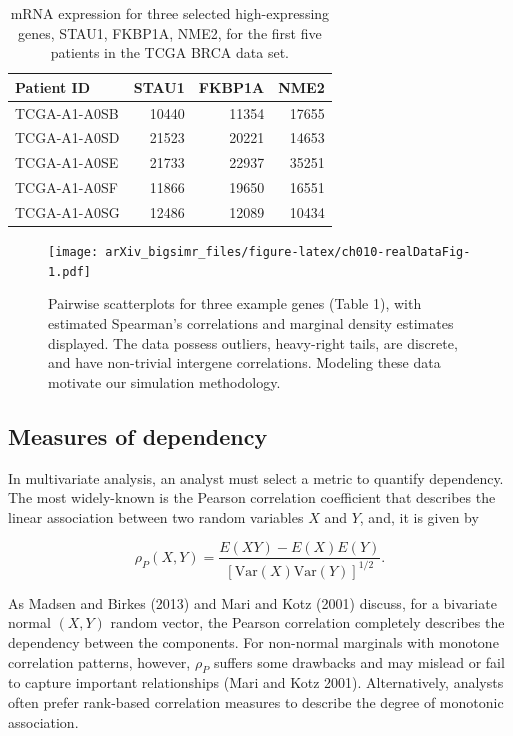 \documentclass{article}
\begin{document}
\begin{table}

\caption{\label{tab:ch010-realDataTab}mRNA expression for three selected high-expressing genes, STAU1, FKBP1A, NME2, for the first five patients in the TCGA BRCA data set.}
\centering
\begin{tabular}[t]{lrrr}
\toprule
Patient ID & STAU1 & FKBP1A & NME2\\
\midrule
TCGA-A1-A0SB & 10440 & 11354 & 17655\\
TCGA-A1-A0SD & 21523 & 20221 & 14653\\
TCGA-A1-A0SE & 21733 & 22937 & 35251\\
TCGA-A1-A0SF & 11866 & 19650 & 16551\\
TCGA-A1-A0SG & 12486 & 12089 & 10434\\
\bottomrule
\end{tabular}
\end{table}

\begin{figure}
\centering
\texttt{[image: arXiv\_bigsimr\_files/figure-latex/ch010-realDataFig-1.pdf]}
\caption{Pairwise scatterplots for three example genes (Table 1), with
estimated Spearman's correlations and marginal density estimates
displayed. The data possess outliers, heavy-right tails, are discrete,
and have non-trivial intergene correlations. Modeling these data
motivate our simulation methodology.}
\end{figure}

\hypertarget{measures-of-dependency}{%
\subsection{Measures of dependency}\label{measures-of-dependency}}

In multivariate analysis, an analyst must select a metric to quantify
dependency. The most widely-known is the Pearson correlation coefficient
that describes the linear association between two random variables \(X\)
and \(Y\), and, it is given by

\begin{equation}
\rho_P(X,Y) = \frac{E(XY) - E(X)E(Y)}{\left[ \mathrm{Var}(X)\mathrm{Var}(Y)\right]^{1/2}}.
\label{eq:pearson}
\end{equation}

As Madsen and Birkes (2013) and Mari and Kotz (2001) discuss, for a
bivariate normal \((X,Y)\) random vector, the Pearson correlation
completely describes the dependency between the components. For
non-normal marginals with monotone correlation patterns, however,
\(\rho_P\) suffers some drawbacks and may mislead or fail to capture
important relationships (Mari and Kotz 2001). Alternatively, analysts
often prefer rank-based correlation measures to describe the degree of
monotonic association.
\end{document}
